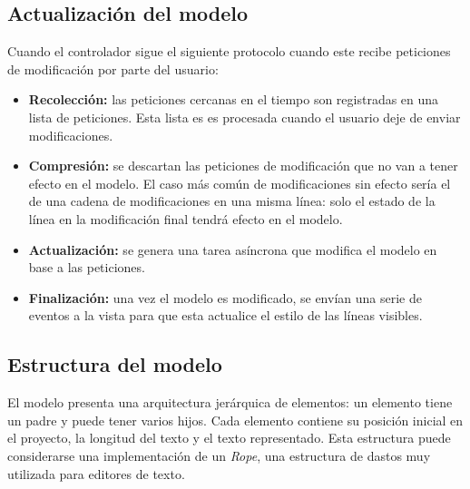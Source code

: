 \subsection{Actualización del modelo}\label{subsec:actualizacion-del-modelo}

Cuando el controlador sigue el siguiente
protocolo cuando este recibe peticiones de modificación
por parte del usuario:
\begin{itemize}
    \item \textbf{Recolección:} las peticiones cercanas
    en el tiempo son registradas en una lista de peticiones.
    Esta lista es es procesada cuando el usuario deje
    de enviar modificaciones.
    \item \textbf{Compresión:} se descartan las peticiones
    de modificación que no van a tener efecto en el modelo.
    El caso más común de modificaciones sin efecto sería
    el de una cadena de modificaciones en una misma línea:
    solo el estado de la línea en la modificación final
    tendrá efecto en el modelo.
    \item \textbf{Actualización:} se genera una tarea
    asíncrona que modifica el modelo en base a las
    peticiones.
    \item \textbf{Finalización:} una vez el modelo
    es modificado, se envían una serie de eventos
    a la vista para que esta actualice el estilo
    de las líneas visibles.
\end{itemize}

\subsection{Estructura del modelo}\label{subsec:estructura-del-modelo}

El modelo presenta una arquitectura jerárquica de elementos:
un elemento tiene un padre y puede tener varios hijos.
Cada elemento contiene su posición inicial en el proyecto, la
longitud del texto y el texto representado.
Esta estructura puede considerarse una implementación de un
\textit{Rope}\cite{ROPES}, una estructura de dastos muy
utilizada para editores de texto.

\begin{center}
\end{center}


